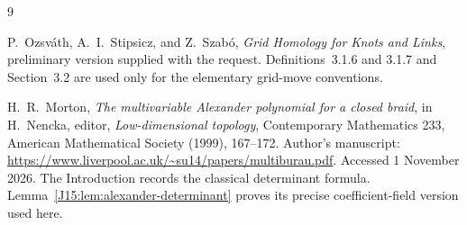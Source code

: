 \documentclass[11pt,oneside]{report}
\theoremstyle{definition}
\numberwithin{equation}{section}
\begin{document}
\renewcommand{\bibname}{References}
\begin{thebibliography}{9}

P.~Ozsv\'ath, A.~I.~Stipsicz, and Z.~Szab\'o,
\emph{Grid Homology for Knots and Links}, preliminary version supplied
with the request. Definitions~3.1.6 and 3.1.7 and Section~3.2 are used
only for the elementary grid-move conventions.


H.~R.~Morton,
\emph{The multivariable Alexander polynomial for a closed braid},
in H.~Nencka, editor, \emph{Low-dimensional topology},
Contemporary Mathematics 233, American Mathematical Society (1999),
167--172. Author's manuscript:
\url{https://www.liverpool.ac.uk/~su14/papers/multiburau.pdf}.
Accessed 1 November 2026. The Introduction records the classical
determinant formula. Lemma~\ref{J15:lem:alexander-determinant} proves
its precise coefficient-field version used here.

\end{thebibliography}
\end{document}

